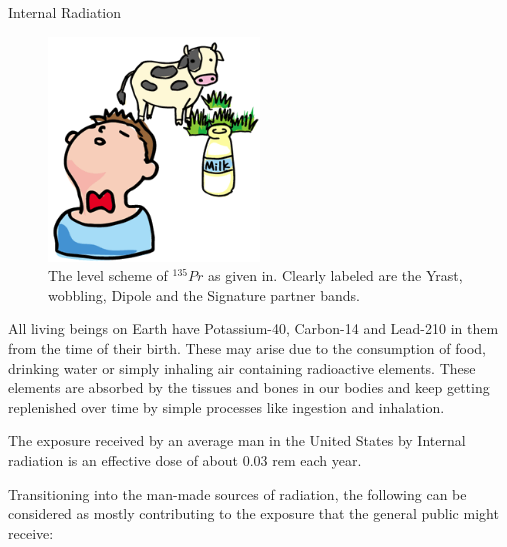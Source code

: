 \documentclass[%
 amsmath,amssymb,
]{article}
\begin{document}
\begin{section}{Internal Radiation}
\begin{figure}
\begin{center}
\includegraphics[width = 0.5\textwidth]{internal_radiation}
\caption{The level scheme of $^{135}Pr$ as given in. Clearly labeled are the Yrast, wobbling, Dipole and the Signature partner bands.}
\end{center}
\end{figure}

All living beings on Earth have Potassium-40, Carbon-14 and Lead-210 in them from the time of their birth. These may arise due to the consumption of food, drinking water or simply inhaling air containing radioactive elements. These elements are absorbed by the tissues and bones in our bodies and keep getting replenished over time by simple processes like ingestion and inhalation.

The exposure received by an average man in the United States by Internal radiation is an effective dose of about 0.03 rem each year.

\end{section}


Transitioning into the man-made sources of radiation, the following can be considered as mostly contributing to the exposure that the general public might receive:
\end{document}

